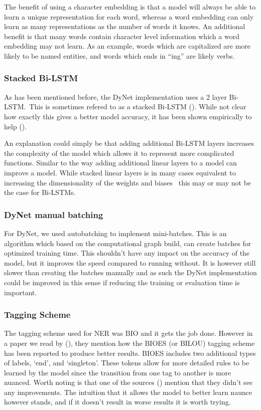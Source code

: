 The benefit of using a character embedding is that a model will always be able
to learn a unique representation for each word, whereas a word embedding can
only learn as many representations as the number of words it knows. An
additional benefit is that many words contain character level information which
a word embedding may not learn. As an example, words which are capitalized are
more likely to be named entities, and words which ends in ``ing'' are likely
verbs.

\subsubsection{Stacked Bi-LSTM}

As has been mentioned before, the DyNet implementation uses a 2 layer Bi-LSTM.\
This is sometimes refered to as a stacked
Bi-LSTM (\cite[Chapter~14.5]{goldberg2017neural}). While not clear how exactly
this gives a better model accuracy, it has been shown empirically to
help (\cite{reimers2017reporting}).

An explanation could simply be that adding additional Bi-LSTM layers increases
the complexity of the model which allows it to represent more complicated
functions. Similar to the way adding additional linear layers to a model can
improve a model. While stacked linear layers is in many cases equivalent to
increasing the dimensionality of the weights and
biases~\cite[pp.~199]{goodfellow2016deep} this may or may not be the case for
Bi-LSTMs.

\subsubsection{DyNet manual batching}

For DyNet, we used autobatching to implement mini-batches. This is an algorithm
which based on the computational graph build, can create batches for optimized
training time. This shouldn't have any impact on the accuracy of the model, but
it improves the speed compared to running without. It is however still slower
than creating the batches manually and as such the DyNet implementation could be
improved in this sense if reducing the training or evaluation time is important.

\subsubsection{Tagging Scheme}

The tagging scheme used for NER was BIO and it gets the job done. However in a
paper we read by (\cite{ma2016endtoend}), they mention how the BIOES (or BILOU)
tagging scheme has been reported to produce better results. BIOES includes two
additional types of labels, `end', and `singleton'. These tokens allow for more
detailed rules to be learned by the model since the transition from one tag to
another is more nuanced. Worth noting is that one of the sources
(\cite{lample2016neural}) mention that they didn't see any improvements. The
intuition that it allows the model to better learn naunce however stands, and if
it doesn't result in worse results it is worth trying.

